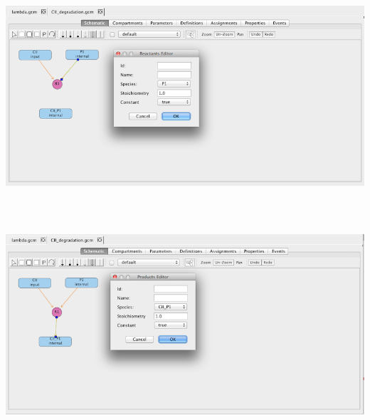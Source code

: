 \documentclass[titlepage,11pt]{article}
\begin{document}
\begin{center}
\includegraphics[height=80mm]{screenshots/reactant} 
\end{center}

\begin{center}
\includegraphics[height=80mm]{screenshots/product}
\end{center}
\end{document}
